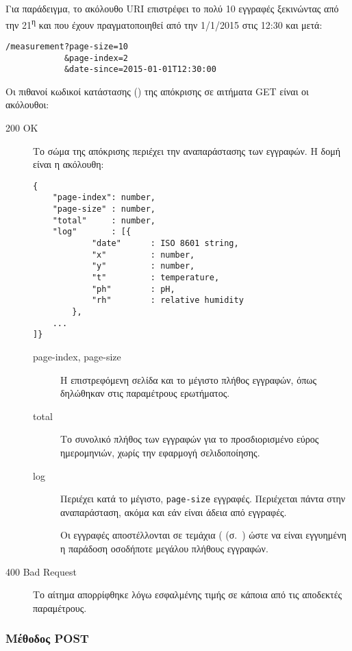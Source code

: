 Για παράδειγμα, το ακόλουθο URI επιστρέφει το πολύ 10 εγγραφές ξεκινώντας από
την 21\textsuperscript{η} και που έχουν πραγματοποιηθεί από την 1/1/2015 στις
12:30 και μετά:
\begin{lstlisting}
/measurement?page-size=10
            &page-index=2
            &date-since=2015-01-01T12:30:00
\end{lstlisting}

Οι πιθανοί κωδικοί κατάστασης () της απόκρισης σε αιτήματα GET
είναι οι ακόλουθοι:
\begin{description}
    \item[200 OK] Το σώμα της απόκρισης περιέχει την αναπαράστασης των εγγραφών.
    Η δομή είναι η ακόλουθη:
    \begin{lstlisting}
{
    "page-index": number,
    "page-size" : number,
    "total"     : number,
    "log"       : [{
            "date"      : ISO 8601 string,
            "x"         : number,
            "y"         : number,
            "t"         : temperature,
            "ph"        : pH,
            "rh"        : relative humidity
        },
    ...
]}
    \end{lstlisting}
    \begin{description}
        \item[page-index, page-size] Η επιστρεφόμενη σελίδα και το μέγιστο
        πλήθος εγγραφών, όπως δηλώθηκαν στις παραμέτρους ερωτήματος.

        \item[total] Το συνολικό πλήθος των εγγραφών για το προσδιορισμένο
        εύρος ημερομηνιών, χωρίς την εφαρμογή σελιδοποίησης.

        \item[log] Περιέχει κατά το μέγιστο, \verb~page-size~ εγγραφές.
        Περιέχεται πάντα στην αναπαράσταση, ακόμα και εάν είναι άδεια από
        εγγραφές.

        Οι εγγραφές αποστέλλονται σε τεμάχια
        (
        (σ.~\pageref{ssubsec:network:chunked-output}) ώστε να είναι εγγυημένη η
        παράδοση οσοδήποτε μεγάλου πλήθους εγγραφών.
    \end{description}

    \item[400 Bad Request] Το αίτημα απορρίφθηκε λόγω εσφαλμένης τιμής σε κάποια
    από τις αποδεκτές παραμέτρους.
\end{description}


\subsubsection{Μέθοδος POST}

